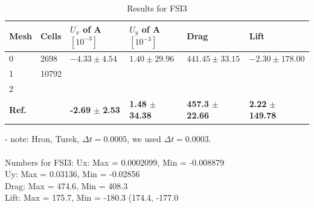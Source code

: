 \begin{table}[!h]
  \begin{center}
  \begin{tabular}{|l | l | l | l | l | l|} \hline
	Mesh & Cells & $U_x$ of A $[10^{-3}]$ & $U_y$ of A $[10^{-3}]$ & Drag & Lift\\ \hline
    0  & 2698 & $ -4.33 \pm 4.54$ & $ 1.40 \pm 29.96$ & $441.45 \pm 33.15 $ & $-2.30 \pm 178.00$\\   \hline
    1 & 10792 & $ $&  $ $ & $ $ & $ $\\ \hline
    2 &  & $ $&  $ $ & $ $ & $ $   \\ \hline \hline
    \textbf{Ref.}  & & \textbf{-2.69} $\pm$ \textbf{2.53} & \textbf{1.48} $\pm$ \textbf{34.38} & \textbf{457.3} $\pm$ \textbf{22.66} & \textbf{2.22} $\pm$ \textbf{149.78}\\ \hline 
    \hline

  \end{tabular}
	  \caption{Results for FSI3}
  \end{center}
\end{table}
- note: Hron, Turek, $\Delta t = 0.0005$, we used $\Delta t = 0.0003$. \\ \\
Numbers for FSI3:
Ux: Max = 0.0002099, Min = -0.008879 \\
Uy: Max = 0.03136, Min = -0.02856 \\
Drag: Max = 474.6, Min = 408.3 \\
Lift: Max = 175.7, Min = -180.3 (174.4, -177.0\\
